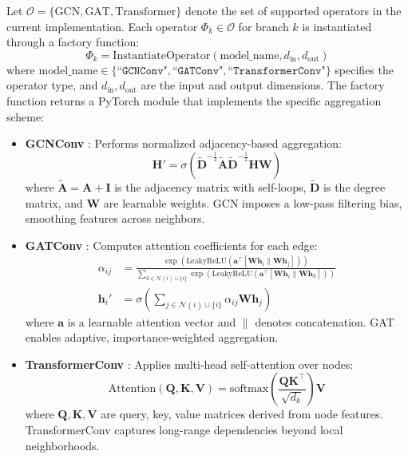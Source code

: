 Let $\mathcal{O} = \{\text{GCN}, \text{GAT}, \text{Transformer}\}$ denote the set of supported operators in the current implementation. Each operator $\Phi_k \in \mathcal{O}$ for branch $k$ is instantiated through a factory function:
\begin{equation}
\Phi_k = \text{InstantiateOperator}(\text{model\_name}, d_{\text{in}}, d_{\text{out}})
\end{equation}
where $\text{model_name} \in \{\texttt{``GCNConv"}, \texttt{``GATConv"}, \texttt{``TransformerConv"}\}$ specifies the operator type, and $d_{\text{in}}, d_{\text{out}}$ are the input and output dimensions. The factory function returns a PyTorch module that implements the specific aggregation scheme:

\begin{itemize}
    \item \textbf{GCNConv} \cite{kipf2016semi}: Performs normalized adjacency-based aggregation:
    \begin{equation}
    \mathbf{H}' = \sigma\left(\tilde{\mathbf{D}}^{-\frac{1}{2}}\tilde{\mathbf{A}}\tilde{\mathbf{D}}^{-\frac{1}{2}}\mathbf{H}\mathbf{W}\right)
    \end{equation}
    where $\tilde{\mathbf{A}} = \mathbf{A} + \mathbf{I}$ is the adjacency matrix with self-loops, $\tilde{\mathbf{D}}$ is the degree matrix, and $\mathbf{W}$ are learnable weights. GCN imposes a low-pass filtering bias, smoothing features across neighbors.

    \item \textbf{GATConv} \cite{velivckovic2017graph}: Computes attention coefficients for each edge:
    \begin{align}
    \alpha_{ij} &= \frac{\exp\left(\text{LeakyReLU}\left(\mathbf{a}^{\top}[\mathbf{W}\mathbf{h}_i \| \mathbf{W}\mathbf{h}_j]\right)\right)}{\sum_{k \in \mathcal{N}(i) \cup \{i\}} \exp\left(\text{LeakyReLU}\left(\mathbf{a}^{\top}[\mathbf{W}\mathbf{h}_i \| \mathbf{W}\mathbf{h}_k]\right)\right)} \\
    \mathbf{h}_i' &= \sigma\left(\sum_{j \in \mathcal{N}(i) \cup \{i\}} \alpha_{ij} \mathbf{W}\mathbf{h}_j\right)
    \end{align}
    where $\mathbf{a}$ is a learnable attention vector and $\|$ denotes concatenation. GAT enables adaptive, importance-weighted aggregation.

    \item \textbf{TransformerConv} \cite{dwivedi2020generalization}: Applies multi-head self-attention over nodes:
    \begin{equation}
    \text{Attention}(\mathbf{Q}, \mathbf{K}, \mathbf{V}) = \text{softmax}\left(\frac{\mathbf{Q}\mathbf{K}^{\top}}{\sqrt{d_k}}\right)\mathbf{V}
    \end{equation}
    where $\mathbf{Q}, \mathbf{K}, \mathbf{V}$ are query, key, value matrices derived from node features. TransformerConv captures long-range dependencies beyond local neighborhoods.
\end{itemize}


